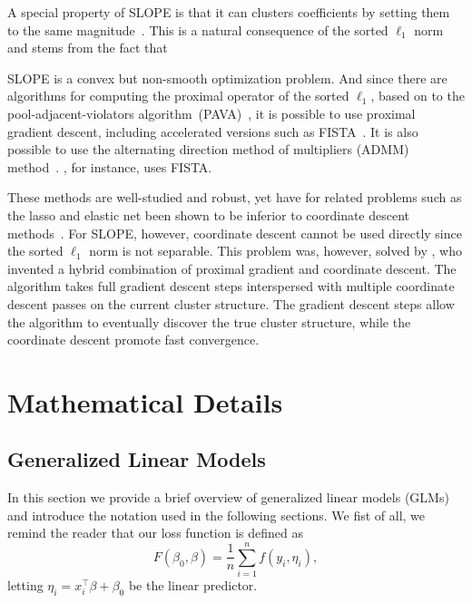 \documentclass[article]{jss}
\begin{document}


A special property of SLOPE is that it can clusters coefficients by
setting them to the same magnitude~\citep{figueiredo2016,bogdan2022}. This is a natural
consequence of the sorted \(\ell_1\) norm and stems from the fact that

SLOPE is a convex but non-smooth optimization problem. And since there are
algorithms for computing the proximal operator of the sorted \(\ell_1\), based
on to the pool-adjacent-violators algorithm~(PAVA)~\citep{barlow1972}, it is
possible to use proximal gradient descent, including accelerated versions such
as FISTA~\citep{beck2009}. It is also possible to use the alternating direction
method of multipliers (ADMM) method~\citep{boyd2010}. \citet{bogdan2015}, for
instance, uses FISTA.

These methods are well-studied and robust, yet have for related problems such
as the lasso and elastic net been shown to be inferior to coordinate descent
methods~\citep{friedman2007,friedman2010}. For SLOPE, however, coordinate
descent cannot be used directly since the sorted \(\ell_1\) norm is not
separable. This problem was, however, solved by \citet{larsson2023}, who invented a
hybrid combination of proximal gradient and coordinate descent. The
algorithm takes full gradient descent steps interspersed with multiple
coordinate descent passes on the current cluster structure. The gradient descent
steps allow the algorithm to eventually discover the true cluster structure,
while the coordinate descent promote fast convergence.

\section{Mathematical Details}

\subsection{Generalized Linear Models}
\label{sec:glm}

In this section we provide a brief overview of generalized linear models (GLMs)
and introduce the notation used in the following sections. We fist of all,
we remind the reader that our loss function is defined as
\[
  F(\beta_0, \beta) = \frac{1}{n} \sum_{i=1}^n f(y_i, \eta_i),
\]
letting \(\eta_i = x_i^\intercal \beta + \beta_0\) be the
linear predictor.
\end{document}
